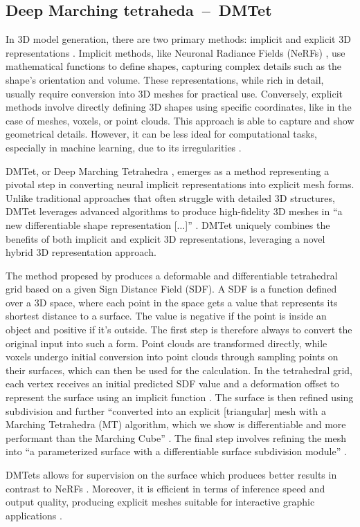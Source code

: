\subsection{Deep Marching tetraheda~--~DMTet}\label{DMTet}

In 3D model generation, there are two primary methods: implicit and explicit 3D representations \citep{shen2021DMTet}. Implicit methods, like Neuronal Radiance Fields (NeRFs) \citep{mildenhallNERF}, use mathematical functions to define shapes, capturing complex details such as the shape's orientation and volume. These representations, while rich in detail, usually require conversion into 3D meshes for practical use. Conversely, explicit methods involve directly defining 3D shapes using specific coordinates, like in the case of meshes, voxels, or point clouds. This approach is able to capture and show geometrical details. However, it can be less ideal for computational tasks, especially in machine learning, due to its irregularities \citep{michalkiewicz2019deep}.

DMTet, or Deep Marching Tetrahedra \citep{shen2021DMTet}, emerges as a method representing a pivotal step in converting neural implicit representations into explicit mesh forms. Unlike traditional approaches that often struggle with detailed 3D structures, DMTet leverages advanced algorithms to produce high-fidelity 3D meshes in ``a new differentiable shape representation [\(\ldots\)]'' \citep{shen2021DMTet}. DMTet uniquely combines the benefits of both implicit and explicit 3D representations, leveraging a novel hybrid 3D representation approach.

The method propesed by \citeauthor{shen2021DMTet} produces a deformable and differentiable tetrahedral grid based on a given Sign Distance Field (SDF). A SDF is a function defined over a 3D space, where each point in the space gets a value that represents its shortest distance to a surface. The value is negative if the point is inside an object and positive if it's outside. The first step is therefore always to convert the original input into such a form. Point clouds are transformed directly, while voxels undergo initial conversion into point clouds through sampling points on their surfaces, which can then be used for the calculation. In the tetrahedral grid, each vertex receives an initial predicted SDF value and a deformation offset to represent the surface using an implicit function \citep{shen2021DMTet}. The surface is then refined using subdivision and further ``converted into an explicit [triangular] mesh with a Marching Tetrahedra (MT) algorithm, which we show is differentiable and more performant than the Marching Cube'' \citep{shen2021DMTet}. The final step involves refining the mesh into ``a parameterized surface with a differentiable surface subdivision module'' \citep{shen2021DMTet}.

DMTets allows for supervision on the surface which produces better results in contrast to NeRFs \citep{shen2021DMTet}. Moreover, it is efficient in terms of inference speed and output quality, producing explicit meshes suitable for interactive graphic applications \citep{shen2021DMTet}.
